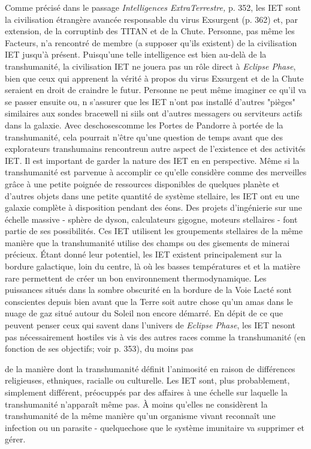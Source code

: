 Comme précisé dans le passage \textit{Intelligences ExtraTerrestre,} p. 352, les IET sont la civilisation étrangère avancée responsable du virus Exsurgent (p. 362) et, par extension, de la corruptinb des TITAN et de la Chute. Personne, pas même les Facteurs, n'a rencontré de membre (a supposer qu'ils existent) de la civilisation IET jusqu'à présent. Puisqu'une telle intelligence est bien au-delà de la transhumanité, la civilisation IET ne jouera pas un rôle direct à \textit{}\textit{ Eclipse Phase}, bien que ceux qui apprenent la vérité à propos du virus Exsurgent et de la Chute seraient en droit de craindre le futur. Personne ne peut même imaginer ce qu'il va se passer ensuite ou, n s'assurer que les IET n'ont pas installé d'autres "pièges" similaires aux sondes bracewell ni siils ont d'autres messagers ou serviteurs actifs dans la galaxie. Avec deschosescomme les Portes de Pandorre à portée de la transhumanité, cela pourrait n'être qu'une question de temps avant que des explorateurs transhumains rencontreun autre aspect de l'existence et des activités IET. Il est important de garder la nature des IET en en perspective. Même si la transhumanité est parvenue à accomplir ce qu'elle considère comme des merveilles grâce à une petite poignée de ressources disponibles de quelques planète et d'autres objets dans une petite quantité de système stellaire, les IET ont eu une galaxie complète à disposition pendant des éons. Des projets d'ingénierie sur une échelle massive - sphère de dyson, calculateurs gigogne, moteurs stellaires - font partie de ses possibilités. Ces IET utilisent les groupements stellaires de la même manière que la transhumanité utilise des champs ou des gisements de minerai précieux. Étant donné leur potentiel, les IET existent principalement sur la bordure galactique, loin du centre, là où les basses températures et et la matière rare permettent de créer un bon environnement thermodynamique. Les puissances situés dans la sombre obscurité en la bordure de la Voie Lacté sont conscientes depuis bien avant que la Terre soit autre chose qu'un amas dans le nuage de gaz situé autour du Soleil non encore démarré. En dépit de ce que peuvent penser ceux qui savent dans l'univers de \textit{}\textit{Eclipse Phase}, les IET nesont pas nécessairement hostiles vis à vis des autres races comme la transhumanité (en fonction de ses objectifs; voir p. 353), du moins pas 

de la manière dont la transhumanité définit l'animosité en raison de différences religieuses, ethniques, racialle ou culturelle. Les IET sont, plus probablement, simplement différent, préocuppés par des affaires à une échelle sur laquelle la transhumanité n'apparaît même pas. À moins qu'elles ne considèrent la transhumanité de la même manière qu'un organisme vivant reconnaît une infection ou un parasite - quelquechose que le système imunitaire va supprimer et gérer. 

